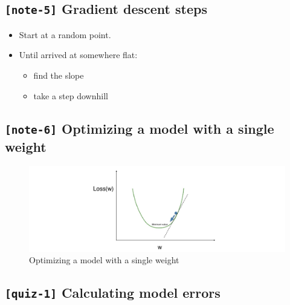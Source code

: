 \documentclass[11pt, twoside]{article}
\begin{document}
    \hypertarget{note-5-gradient-descent-steps}{%
\subsection{\texorpdfstring{\texttt{{[}note-5{]}} Gradient descent
steps}{{[}note-5{]} Gradient descent steps}}\label{note-5-gradient-descent-steps}}

\begin{itemize}
\item
  Start at a random point.
\item
  Until arrived at somewhere flat:

  \begin{itemize}
  \item
    find the slope
  \item
    take a step downhill
  \end{itemize}
\end{itemize}

    \hypertarget{note-6-optimizing-a-model-with-a-single-weight}{%
\subsection{\texorpdfstring{\texttt{{[}note-6{]}} Optimizing a model
with a single
weight}{{[}note-6{]} Optimizing a model with a single weight}}\label{note-6-optimizing-a-model-with-a-single-weight}}

\begin{figure}
\centering
\includegraphics{../Figures/3. Optimizing a model with a single weight.jpg}
\caption{Optimizing a model with a single weight}
\end{figure}

    \hypertarget{quiz-1-calculating-model-errors}{%
\subsection{\texorpdfstring{\texttt{{[}quiz-1{]}} Calculating model
errors}{{[}quiz-1{]} Calculating model errors}}\label{quiz-1-calculating-model-errors}}
\end{document}
